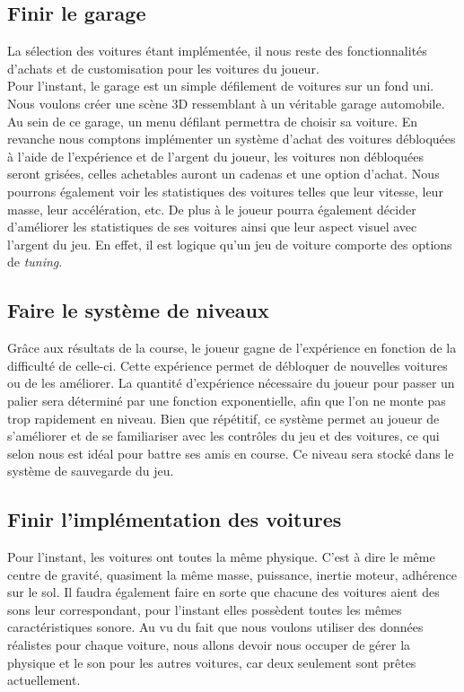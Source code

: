 \documentclass[12pt,a4paper]{article}
\begin{document}
        \subsection{Finir le garage}
            La sélection des voitures étant implémentée, il nous reste des fonctionnalités
            d'achats et de customisation pour les voitures du joueur.\\
            Pour l'instant, le garage est un simple défilement de voitures sur un fond uni.
            Nous voulons créer une scène 3D ressemblant à un véritable garage automobile.
            Au sein de ce garage, un menu défilant permettra de choisir sa voiture.
            En revanche nous comptons implémenter un système d'achat des voitures débloquées
            à l'aide de l'expérience et de l'argent du joueur, les voitures non débloquées
            seront grisées, celles achetables auront un cadenas et une option d'achat.
            Nous pourrons également voir les statistiques des voitures telles que leur vitesse,
            leur masse, leur accélération, etc. De plus à le joueur pourra également décider
            d'améliorer les statistiques de ses voitures ainsi que leur aspect visuel avec l'argent
            du jeu. En effet, il est logique qu'un jeu de voiture comporte des options de
            \textit{tuning}.

        \subsection{Faire le système de niveaux}
            Grâce aux résultats de la course, le joueur gagne de l'expérience en fonction de la
            difficulté de celle-ci. Cette expérience permet de débloquer de nouvelles voitures
            ou de les améliorer. La quantité d'expérience nécessaire du joueur pour passer un palier
            sera déterminé par une fonction exponentielle, afin que l'on ne monte pas trop rapidement 
            en niveau. Bien que répétitif, ce système permet au joueur 
            de s'améliorer et de se familiariser avec les contrôles du 
            jeu et des voitures, ce qui selon nous est idéal pour battre ses amis en course.
            Ce niveau sera stocké dans le système de sauvegarde du jeu.

        \subsection{Finir l'implémentation des voitures}
           Pour l'instant, les voitures ont toutes la même physique. C'est à dire le même
           centre de gravité, quasiment la même masse, puissance, inertie moteur, adhérence sur le 
           sol.
           Il faudra également faire en sorte que chacune des voitures aient des sons leur correspondant,
           pour l'instant elles possèdent toutes les mêmes caractéristiques sonore.
           Au vu du fait que nous voulons utiliser des données réalistes pour chaque voiture,
           nous allons devoir nous occuper de gérer la physique et le son pour les autres voitures,
           car deux seulement sont prêtes actuellement.  
        
\end{document}
